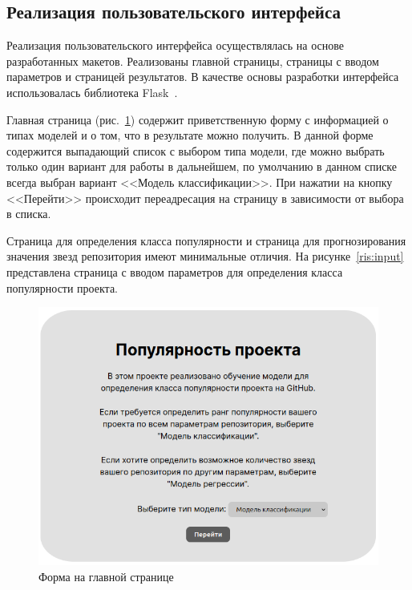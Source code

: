 \subsection{Реализация пользовательского интерфейса}

Реализация пользовательского интерфейса осуществлялась на основе разработанных макетов. Реализованы главной страницы, страницы с вводом параметров и страницей результатов. В качестве основы разработки интерфейса использовалась библиотека Flask~\cite{flask}.

Главная страница (рис.~\ref{ris:main}) содержит приветственную форму с информацией о типах моделей и о том, что в результате можно получить. В данной форме содержится выпадающий список с выбором типа модели, где можно выбрать только один вариант для работы в дальнейшем, по умолчанию в данном списке всегда выбран вариант <<Модель классификации>>. При нажатии на кнопку <<Перейти>>  происходит переадресация на страницу в зависимости от выбора в списка.


Страница для определения класса популярности и страница для прогнозирования значения звезд репозитория имеют минимальные отличия. На рисунке~\ref{ris:input} представлена страница с вводом параметров для определения класса популярности проекта. 

\begin{figure}[h]
    \centering
    \includegraphics[width=1\linewidth]{pic/main.png}
    \vspace{-0.5em}    \caption{Форма на главной странице}
    \label{ris:main}
\end{figure}
\vspace{1em}

